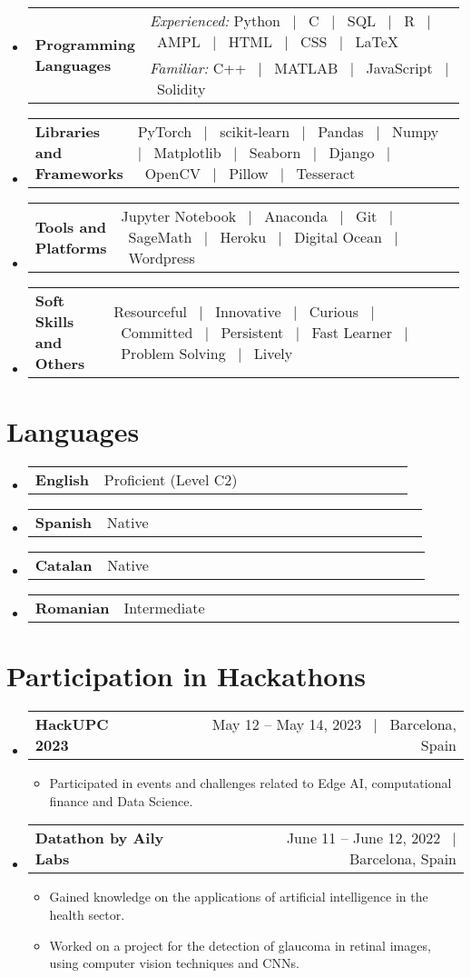 \documentclass[a4paper,11pt]{article}
\makeatletter
\newcommand{\resumeSectionTypeOne}[2]{
  \item\begin{tabular*}{0.99\textwidth}[t]{
    p{0.18\linewidth}p{0.81\linewidth}
  }
  \textbf{#1} & #2
  \end{tabular*}\vspace{-2pt}
}
\newcommand{\resumeSectionTypeTwo}[3]{
  \item\begin{tabular*}{0.99\textwidth}[t]{
    p{0.18\linewidth}p{0.81\linewidth}
  }
  \multirow{2}{0.20\linewidth}{\textbf{#1}} & #2 \\
                                            & #3
  \end{tabular*}\vspace{-2pt}
}
\newcommand{\resumeTrioHeading}[3]{
  \item
    \begin{tabular*}{0.96\textwidth}[t]{
      l@{\extracolsep{\fill}}c@{\extracolsep{\fill}}r
    }
      \textbf{#1} & \small \textit{#2} & \small #3
    \end{tabular*}
}
\newcommand{\resumeHeadingListStart}{
  \begin{itemize}[leftmargin=0.15in, label={}]
}
\newcommand{\resumeHeadingListEnd}{\end{itemize}}
\makeatother
\begin{document}
  \resumeHeadingListStart{}
    \resumeSectionTypeTwo{Programming Languages}{\textit{\small Experienced:}\: Python \ $|$ \ C \ $|$ \ SQL \ $|$ \ R \ $|$ \ AMPL \ $|$ \ HTML \ $|$ \ CSS \ $|$ \ \LaTeX}{\textit{\small Familiar:}\:  C++ \ $|$ \ MATLAB \ $|$ \ JavaScript \ $|$ \ Solidity}
  \resumeHeadingListEnd{}

  \resumeHeadingListStart{}
    \resumeSectionTypeOne{Libraries and Frameworks}{PyTorch \ $|$ \ scikit-learn \ $|$ \ Pandas \ $|$ \ Numpy \ $|$ \ Matplotlib \ $|$ \ Seaborn \ $|$ \ Django \ $|$ \ OpenCV \ $|$ \ Pillow \ $|$ \ Tesseract}
  \resumeHeadingListEnd{}
  
  \resumeHeadingListStart{}
    \resumeSectionTypeOne{Tools and Platforms}{Jupyter Notebook \ $|$ \ Anaconda \ $|$ \ Git \ $|$ \ SageMath \ $|$ \ Heroku \ $|$ \ Digital Ocean \ $|$ \ Wordpress}
  \resumeHeadingListEnd{}

  \resumeHeadingListStart{}
    \resumeSectionTypeOne{Soft Skills and Others}{Resourceful \ $|$ \ Innovative \ $|$ \ Curious \ $|$ \ Committed \ $|$ \ Persistent \ $|$ \ Fast Learner \ $|$ \ Problem Solving \ $|$ \ Lively }
  \resumeHeadingListEnd{}

\section{Languages}
  \resumeHeadingListStart{}
    \resumeSectionTypeOne{English}{Proficient (Level C2)}
    \resumeSectionTypeOne{Spanish}{Native}
    \resumeSectionTypeOne{Catalan}{Native}
    \resumeSectionTypeOne{Romanian}{Intermediate}
  \resumeHeadingListEnd{}

\section{Participation in Hackathons}
  \resumeHeadingListStart{}
    \resumeTrioHeading{HackUPC 2023}{}{May 12 – May 14, 2023 \ $|$ \ Barcelona, Spain}
    \begin{itemize}[leftmargin=3em, itemsep=0.1em, topsep=2pt]
      \item \small Participated in events and challenges related to Edge AI, computational finance and Data Science.
    \end{itemize}
  \resumeHeadingListEnd{}

  \resumeHeadingListStart{}
    \resumeTrioHeading{Datathon by Aily Labs}{}{June 11 – June 12, 2022 \ $|$ \ Barcelona, Spain}
      \begin{itemize}[leftmargin=3em, itemsep=0.1em, topsep=2pt]
        \item \small Gained knowledge on the applications of artificial intelligence in the health sector.
        \item \small Worked on a project for the detection of glaucoma in retinal images, using computer vision techniques and CNNs.
      \end{itemize}
  \resumeHeadingListEnd{}
\end{document}
